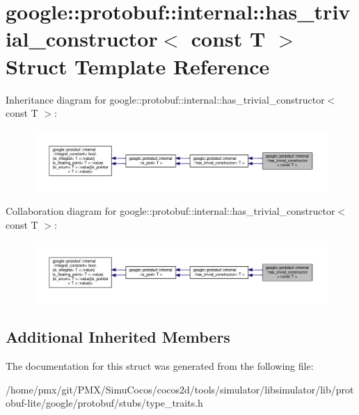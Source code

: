 \hypertarget{structgoogle_1_1protobuf_1_1internal_1_1has__trivial__constructor_3_01const_01T_01_4}{}\section{google\+:\+:protobuf\+:\+:internal\+:\+:has\+\_\+trivial\+\_\+constructor$<$ const T $>$ Struct Template Reference}
\label{structgoogle_1_1protobuf_1_1internal_1_1has__trivial__constructor_3_01const_01T_01_4}


Inheritance diagram for google\+:\+:protobuf\+:\+:internal\+:\+:has\+\_\+trivial\+\_\+constructor$<$ const T $>$\+:
\nopagebreak
\begin{figure}[H]
\begin{center}
\leavevmode
\includegraphics[width=350pt]{structgoogle_1_1protobuf_1_1internal_1_1has__trivial__constructor_3_01const_01T_01_4__inherit__graph}
\end{center}
\end{figure}


Collaboration diagram for google\+:\+:protobuf\+:\+:internal\+:\+:has\+\_\+trivial\+\_\+constructor$<$ const T $>$\+:
\nopagebreak
\begin{figure}[H]
\begin{center}
\leavevmode
\includegraphics[width=350pt]{structgoogle_1_1protobuf_1_1internal_1_1has__trivial__constructor_3_01const_01T_01_4__coll__graph}
\end{center}
\end{figure}
\subsection*{Additional Inherited Members}


The documentation for this struct was generated from the following file\+:\begin{DoxyCompactItemize}
\item 
/home/pmx/git/\+P\+M\+X/\+Simu\+Cocos/cocos2d/tools/simulator/libsimulator/lib/protobuf-\/lite/google/protobuf/stubs/type\+\_\+traits.\+h\end{DoxyCompactItemize}
